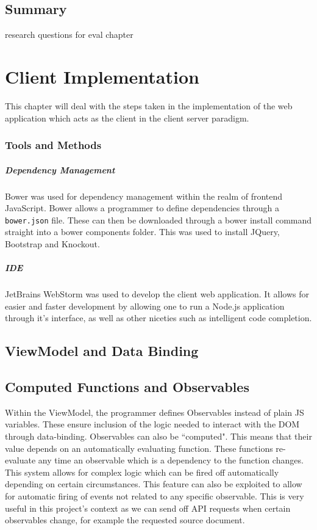 \documentclass{l4proj}
\newcommand{\code}[1]{\texttt{#1}}
\begin{document}
\section{Summary}
research questions for eval chapter

\chapter{Client Implementation}
This chapter will deal with the steps taken in the implementation of the web application which acts as the client in the client server paradigm.

\subsection{Tools and Methods}
\paragraph{Dependency Management}
Bower was used for dependency management within the realm of frontend JavaScript. Bower allows a programmer to define dependencies through a \code{bower.json} file. These can then be downloaded through a bower install command straight into a bower components folder. This was used to install JQuery, Bootstrap and Knockout.

\paragraph{IDE}
JetBrains WebStorm was used to develop the client web application. It allows for easier and faster development by allowing one to run a Node.js application through it's interface, as well as other niceties such as intelligent code completion.

\section{ViewModel and Data Binding} \label{viewmodels}

\section{Computed Functions and Observables}
Within the ViewModel, the programmer defines Observables instead of plain JS variables. These ensure inclusion of the logic needed to interact with the DOM through data-binding. Observables can also be ``computed". This means that their value depends on an automatically evaluating function. These functions re-evaluate any time an observable which is a dependency to the function changes. This system allows for complex logic which can be fired off automatically depending on certain circumstances.
This feature can also be exploited to allow for automatic firing of events not related to any specific observable. This is very useful in this project's context as we can send off API requests when certain observables change, for example the requested source document.
\end{document}
